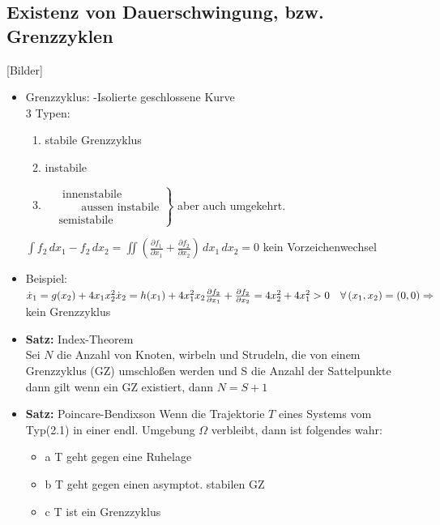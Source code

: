 \documentclass[11pt,a4paper]{article}
\begin{document}
\subsection{Existenz von Dauerschwingung, bzw. Grenzzyklen}
[Bilder]
\begin{itemize}
\item Grenzzyklus: \hspace{1cm}-Isolierte geschlossene Kurve
\\3 Typen:
\begin{enumerate}
\item stabile Grenzzyklus
\item instabile
\item 
$\left.
\begin{matrix}
&\text{~innenstabile}\\
&\text{~~~~~~aussen instabile}\\
&\text{semistabile}
\end{matrix}
\right\}$
aber auch umgekehrt.
\end{enumerate}
$ 
\int f_2 \, dx_1 - f_2\,dx_2 = \iint( \frac{\partial f_1}{\partial x_1} + \frac{\partial f_2}{\partial x_2})\, dx_1\, dx_2 = 0 
$
kein Vorzeichenwechsel
\item Beispiel:\\
$ 
\dot x_1 = g(x_2) + 4x_1x_2^2\\
\dot x_2 = h(x_1) + 4x_1^2x_2\\
\\
\frac{\partial f_2}{\partial x_1} + \frac{\partial f_2}{\partial x_2} = 4 x_2^2 + 4x_1^2 >0 \quad \forall \, (x_1, x_2) = (0,0)\Rightarrow 
$ 
kein Grenzzyklus\\
\item \textbf{Satz:} Index-Theorem\\
Sei $N$ die Anzahl von Knoten, wirbeln und Strudeln, die von einem Grenzzyklus (GZ) umschloßen werden und S die Anzahl der Sattelpunkte dann gilt wenn ein GZ existiert, dann $N=S+1$
\item \textbf{Satz:} Poincare-Bendixson\newline
Wenn die Trajektorie $T$ eines Systems vom Typ(2.1) in einer endl. Umgebung $\Omega$ verbleibt, dann ist folgendes wahr: 
\begin{itemize}
\item {a} T geht gegen eine Ruhelage
\item {b} T geht gegen einen asymptot. stabilen GZ
\item {c} T ist ein Grenzzyklus 
\end{itemize}

\end{itemize}
\end{document}
